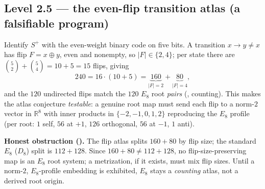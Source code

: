 \subsection{Level 2.5 --- the even-flip transition atlas (a falsifiable program)}
Identify $S^+$ with the even-weight binary code on five bits. A transition $x\to y\neq x$ has flip
$F=x\oplus y$, even and nonempty, so $|F|\in\{2,4\}$; per state there are
$\binom52+\binom54=10+5=15$ flips, giving
\begin{equation}
  240=16\cdot(10+5)=\underbrace{160}_{|F|=2}+\underbrace{80}_{|F|=4},
\end{equation}
and the $120$ undirected flips match the $120$ $E_8$ root \emph{pairs} (\mE, counting). This makes the
atlas conjecture \emph{testable}: a genuine root map must send each flip to a norm-$2$ vector in
$\mathbb R^8$ with inner products in $\{-2,-1,0,1,2\}$ reproducing the $E_8$ profile (per root:
$1$ self, $56$ at $+1$, $126$ orthogonal, $56$ at $-1$, $1$ anti).
\par\smallskip\noindent\textbf{Honest obstruction (\mO).}
The flip atlas splits $160+80$ by flip size; the standard $E_8$ ($D_8$) split is $112+128$. Since
$160+80\neq112+128$, no flip-size-preserving map is an $E_8$ root system; a metrization, if it
exists, must mix flip sizes. Until a norm-$2$, $E_8$-profile embedding is exhibited, $E_8$ stays a
\emph{counting} atlas, not a derived root origin.
\par\smallskip

